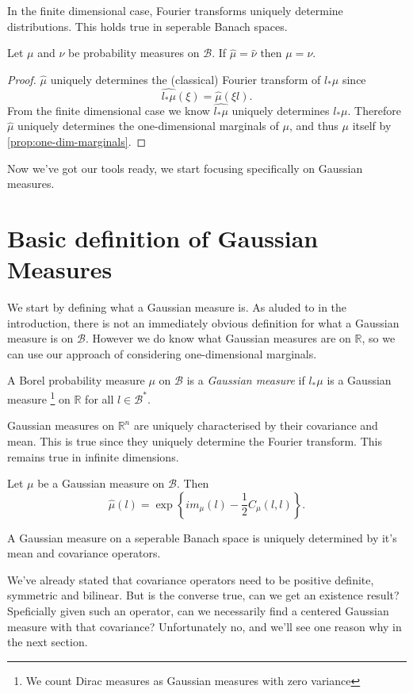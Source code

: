 \documentclass[fontsize=12pt, DIV=10]{scrreprt}
\theoremstyle{remark}
\newcommand{\R}{\mathbb R}
\newcommand{\calB}{\mathcal B}
\begin{document}
In the finite dimensional case, Fourier transforms uniquely determine distributions. This holds true in seperable Banach spaces.
\begin{prop}
	Let $\mu$ and $\nu$ be probability measures on $\calB$. If $\hat{\mu} = \hat{\nu}$ then $\mu = \nu$.
\end{prop}
\begin{proof}
	$\hat{\mu}$ uniquely determines the (classical) Fourier transform of $l_* \mu$ since
	\begin{equation}
		\widehat{l_* \mu}(\xi) = \hat{\mu}(\xi l).
	\end{equation}
	From the finite dimensional case we know $\widehat{l_* \mu}$ uniquely determines $l_* \mu$. Therefore $\hat{\mu}$ uniquely determines the one-dimensional marginals of $\mu$, and thus $\mu$ itself by \vref{prop:one-dim-marginals}.
\end{proof}

Now we've got our tools ready, we start focusing specifically on Gaussian measures.

\section{Basic definition of Gaussian Measures}

We start by defining what a Gaussian measure is. As aluded to in the introduction, there is not an immediately obvious definition for what a Gaussian measure is on $\calB$. However we do know what Gaussian measures are on $\R$, so we can use our approach of considering one-dimensional marginals.
\begin{defn}
	A Borel probability measure $\mu$ on $\calB$ is a \emph{Gaussian measure} if $l_* \mu$ is a Gaussian measure \footnote{We count Dirac measures as Gaussian measures with zero variance} on $\R$ for all $l \in \calB^*$.
\end{defn}

Gaussian measures on $\R^n$ are uniquely characterised by their covariance and mean. This is true since they uniquely determine the Fourier transform. This remains true in infinite dimensions.
\begin{prop}
	Let $\mu$ be a Gaussian measure on $\calB$. Then
	\begin{equation}
		\hat{\mu}(l) = \exp\left\{i m_{\mu}(l) - \frac{1}{2} C_{\mu}(l, l) \right\}.
	\end{equation}
\end{prop}
\begin{corollary}
	A Gaussian measure on a seperable Banach space is uniquely determined by it's mean and covariance operators.
\end{corollary}
We've already stated that covariance operators need to be positive definite, symmetric and bilinear. But is the converse true, can we get an existence result? Speficially given such an operator, can we necessarily find a centered Gaussian measure with that covariance? Unfortunately no, and we'll see one reason why in the next section.
\end{document}
